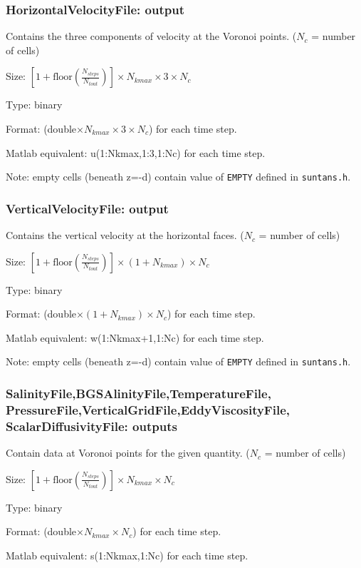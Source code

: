 \documentclass[12pt,oneside]{article}
\begin{document}
\subsubsection{HorizontalVelocityFile: output}

Contains the three components of velocity at the Voronoi points. ($N_c$ = number of cells)
\begin{list}{}
\item Size: $\left[1+\mbox{floor}\left(\frac{N_{steps}}{N_{tout}}\right)\right]\times N_{kmax} \times 3 \times N_c$
\item Type: binary
\item Format: (double$\times N_{kmax} \times 3 \times N_c$) for each time step.  
\item Matlab equivalent: u(1:Nkmax,1:3,1:Nc) for each time step.
\end{list}

\bigskip
\noindent
Note: empty cells (beneath z=-d) contain value of \verb+EMPTY+ defined in \verb+suntans.h+.


\subsubsection{VerticalVelocityFile: output}

Contains the vertical velocity at the horizontal faces. ($N_c$ = number of cells)
\begin{list}{}
\item Size: $\left[1+\mbox{floor}\left(\frac{N_{steps}}{N_{tout}}\right)\right]\times (1+N_{kmax}) \times N_c$
\item Type: binary
\item Format: (double$\times (1+N_{kmax})\times N_c$) for each time step.  
\item Matlab equivalent: w(1:Nkmax+1,1:Nc) for each time step.  
\end{list}

\bigskip
\noindent
Note: empty cells (beneath z=-d) contain value of \verb+EMPTY+ defined in \verb+suntans.h+.

\subsubsection{SalinityFile,BGSAlinityFile,TemperatureFile,\\PressureFile,VerticalGridFile,EddyViscosityFile,\\ScalarDiffusivityFile: outputs}

Contain data at Voronoi points for the given quantity. ($N_c$ = number of cells)
\begin{list}{}
\item Size: $\left[1+\mbox{floor}\left(\frac{N_{steps}}{N_{tout}}\right)\right]\times N_{kmax} \times N_c$
\item Type: binary
\item Format: (double$\times N_{kmax}\times N_c$) for each time step.  
\item Matlab equivalent: s(1:Nkmax,1:Nc) for each time step.  
\end{list}
\end{document}
